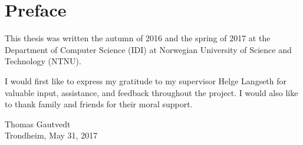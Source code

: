 
\chapter*{Preface}
This thesis was written the autumn of 2016 and the spring of 2017 at the Department of Computer Science (IDI) at Norwegian University of Science and Technology (NTNU). \newline

\noindent I would first like to express my gratitude to my supervisor Helge Langseth for valuable input, assistance, and feedback throughout the project. I would also like to thank family and friends for their moral support. \newline

\begin{flushright}
Thomas Gautvedt \\
Trondheim, May 31, 2017
\end{flushright}